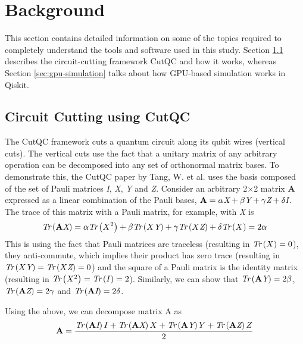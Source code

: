 \section{Background}
\label{chap:background}

This section contains detailed information on some of the topics required to completely understand the tools and software used in this study. Section \ref{sec:circuit-cutting} describes the circuit-cutting framework CutQC and how it works, whereas Section \ref{sec:gpu-simulation} talks about how GPU-based simulation works in Qiskit.

\subsection{Circuit Cutting using CutQC}
\label{sec:circuit-cutting}

The CutQC framework cuts a quantum circuit along its qubit wires (vertical cuts). The vertical cuts use the fact that a unitary matrix of any arbitrary operation can be decomposed into any set of orthonormal matrix bases. To demonstrate this, the CutQC paper by Tang, W. et al. \cite{tang2021cutqc} uses the basis composed of the set of Pauli matrices \emph{I}, \emph{X}, \emph{Y} and \emph{Z}. Consider an arbitrary 2$\times$2 matrix \textbf{A} expressed as a linear combination of the Pauli bases, $\textbf{A} = \alpha\emph{X} + \beta\emph{Y} + \gamma\emph{Z} + \delta\emph{I}$. The trace of this matrix with a Pauli matrix, for example, with \emph{X} is 
$$ \emph{Tr} \left( \textbf{A}\emph{X} \right) =  \alpha\emph{Tr} \left( X^{2} \right) + \beta\emph{Tr} \left( X\emph{Y} \right) + \gamma\emph{Tr} \left( X\emph{Z} \right) + \delta\emph{Tr} \left( X \right) = 2\alpha$$
This is using the fact that Pauli matrices are traceless (resulting in $\emph{Tr} \left( X \right)=0$), they anti-commute, which implies their product has zero trace (resulting in $\emph{Tr} \left( X\emph{Y} \right)=\emph{Tr} \left( X\emph{Z} \right)=0$) and the square of a Pauli matrix is the identity matrix (resulting in $\emph{Tr} \left( X^{2} \right)=\emph{Tr} \left( I \right)=2$). Similarly, we can show that $\emph{Tr} \left( \textbf{A}\emph{Y} \right) = 2\beta$, $\emph{Tr} \left( \textbf{A}\emph{Z} \right) = 2\gamma$ and $\emph{Tr} \left( \textbf{A}\emph{I} \right) = 2\delta$.  

\noindent Using the above, we can decompose matrix A as 
\begin{equation} \label{eq:3.1}
    \textbf{A} = \frac{ \emph{Tr} \left( \textbf{A}\emph{I} \right) I + \emph{Tr} \left( \textbf{A}\emph{X} \right) X + \emph{Tr} \left( \textbf{A}\emph{Y} \right) Y + \emph{Tr} \left( \textbf{A}\emph{Z} \right) Z }{2}
\end{equation}

